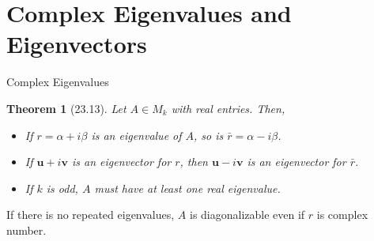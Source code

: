 \documentclass[a4paper,11pt]{article}
\newtheorem{thm}{Theorem}
\newcommand{\bd}{\mathbf}
\begin{document}
\section{Complex Eigenvalues and Eigenvectors} %
\label{sec:complex_eigenvalues_and_eigenvectors}
\begin{frame}[t]{Complex Eigenvalues}
	\begin{thm}
		[23.13] Let $A\in M_k$ with real entries. Then,
		\begin{itemize}
			\item If $r=\alpha+i\beta$ is an eigenvalue of $A$, so is $\bar r = \alpha - i\beta$. 
			\item If $\bd{u}+i\bd{v}$ is an eigenvector for $r$, then $\bd{u}-i\bd{v}$ is an eigenvector for $\bar r$. 
			\item If $k$ is odd, $A$ must have at least one real eigenvalue.
		\end{itemize}
	\end{thm}
	If there is no repeated eigenvalues, $A$ is diagonalizable even if $r$ is complex number.
\end{frame}
\end{document}

